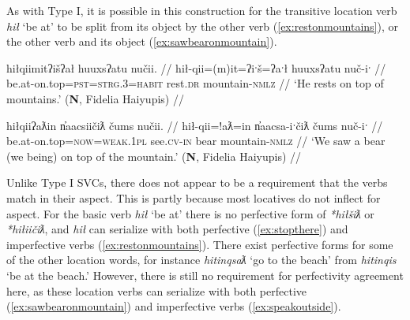 As with Type I, it is possible in this construction for the transitive location verb \textit{hił} `be at' to be split from its object by the other verb (\ref{ex:restonmountains}), or the other verb and its object (\ref{ex:sawbearonmountain}).

\ex \label{ex:restonmountains}
\begingl
\glpreamble hiłqiimitʔišʔał huuxsʔatu nučii. //
\gla hił-qii=(m)it=ʔiˑš=ʔaˑł huuxsʔatu nuč-iˑ //
\glb be.at-on.top=\textsc{pst}=\textsc{strg.3}=\textsc{habit} rest.\textsc{dr} mountain-\textsc{nmlz} //
\glft `He rests on top of mountains.' (\textbf{N}, Fidelia Haiyupis) //
\endgl
\xe

\ex \label{ex:sawbearonmountain}
\begingl
\glpreamble hiłqiiʔaƛin n̓aacsiičiƛ čums nučii. //
\gla hił-qii=!aƛ=in n̓aacsa-iˑčiƛ čums nuč-iˑ //
\glb be.at-on.top=\textsc{now}=\textsc{weak.1pl} see.\textsc{cv}-\textsc{in} bear mountain-\textsc{nmlz} //
\glft `We saw a bear (we being) on top of the mountain.' (\textbf{N}, Fidelia Haiyupis) //
\endgl
\xe

\begin{comment}
\ex~ \label{ex:hiddeninthewall}
\begingl
\glpreamble huptsaapckʷaƛ hinałc̓ił ʔiiḥmisukʔi p̓atquk. //
\gla hupt-saˑp=ckʷiˑ=!aƛ hina-ałc̓ił ʔiiḥmis=uk=ʔiˑ p̓atquk //
\glb hide-\textsc{mo.caus}=remains.of=\textsc{now} \textsc{empty}-in.wall important=\textsc{poss}=\textsc{art} belongings //
\glft `They hid their belongings in the walls.' (\textbf{B}, Bob Mundy) //
\endgl
\xe
\end{comment}

\begin{comment}
This ``interruption" can occur the other way around, when the location word is intransitive.

\ex \label{ex:gasolinebydoor}
\begingl
\glpreamble ḥuqšiƛ ʔucačiƛ ḥaa yaqʔiitq hiiłsʔat̓uus gasoline.\footnotemark //
\gla ḥuq-šiƛ ʔu-ca-čiƛ ḥaa yaq=ʔiˑtq hił-L.sʔat̓uus gasoline //
\glb tip.over-\textsc{mo} \textsc{x}-go-\textsc{mo} who.what=\textsc{defn.3} be.at-by.the.door gasoline //
\glft `It knocked the gasoline over toward the door..' (\textbf{C}, \textit{tupaat} Julia Lucas) //
\endgl
\xe

\footnotetext{In this dependent construction, `gasoline' is the participant of the predicative relativizer \textit{yaq} `who'. The bracketing is [ḥuqšiƛ ʔucačiƛ]\textsubscript{pred} [ḥaa [yaqʔiitq hiiłsʔat̓uus gasoline] ]\textsubscript{part}}
\end{comment}

Unlike Type I SVCs, there does not appear to be a requirement that the verbs match in their aspect. This is partly because most locatives do not inflect for aspect. For the basic verb \textit{hił} `be at' there is no perfective form of \textit{*hiłšiƛ} or \textit{*hiłiičiƛ}, and \textit{hił} can serialize with both perfective (\ref{ex:stopthere}) and imperfective verbs (\ref{ex:restonmountains}). There exist perfective forms for some of the other location words, for instance \textit{hitinqsaƛ} `go to the beach' from \textit{hitinqis} `be at the beach.' However, there is still no requirement for perfectivity agreement here, as these location verbs can serialize with both perfective (\ref{ex:sawbearonmountain}) and imperfective verbs (\ref{ex:speakoutside}).

